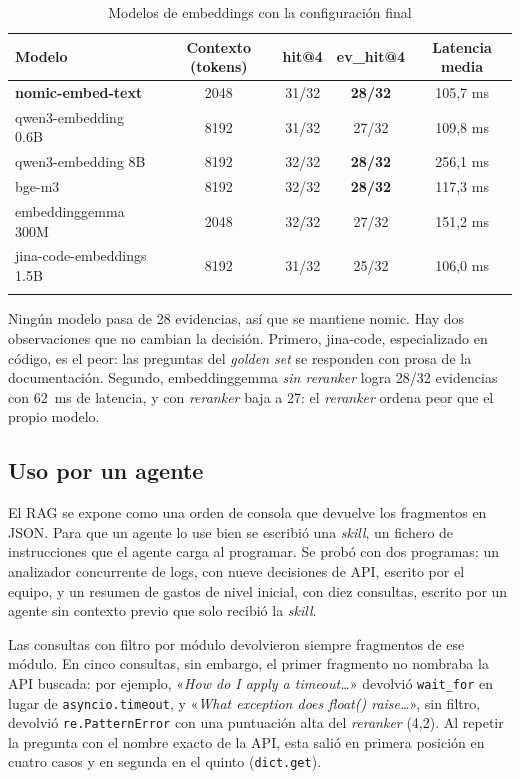 \documentclass[pdflatex,sn-mathphys-num]{sn-jnl}
\begin{document}
\begin{table}[h]
\caption{Modelos de embeddings con la configuración final}\label{tab:modelos}
\begin{tabular}{@{}lcccc@{}}
\toprule
Modelo & Contexto (tokens) & hit@4 & ev\_hit@4 & Latencia media \\
\midrule
\textbf{nomic-embed-text} & 2048 & 31/32 & \textbf{28/32} & 105,7 ms \\
qwen3-embedding 0.6B & 8192 & 31/32 & 27/32 & 109,8 ms \\
qwen3-embedding 8B\footnotemark[1] & 8192 & 32/32 & \textbf{28/32} & 256,1 ms \\
bge-m3 & 8192 & 32/32 & \textbf{28/32} & 117,3 ms \\
embeddinggemma 300M & 2048 & 32/32 & 27/32 & 151,2 ms \\
jina-code-embeddings 1.5B & 8192 & 31/32 & 25/32 & 106,0 ms \\
\botrule
\end{tabular}
\end{table}

Ningún modelo pasa de 28 evidencias, así que se mantiene nomic. Hay dos observaciones que no cambian la decisión. Primero, jina-code, especializado en código, es el peor: las preguntas del \emph{golden set} se responden con prosa de la documentación. Segundo, embeddinggemma \emph{sin reranker} logra 28/32 evidencias con 62~ms de latencia, y con \emph{reranker} baja a 27: el \emph{reranker} ordena peor que el propio modelo.

\subsection{Uso por un agente}\label{sec:res-agente}

El RAG se expone como una orden de consola que devuelve los fragmentos en JSON. Para que un agente lo use bien se escribió una \emph{skill}, un fichero de instrucciones que el agente carga al programar. Se probó con dos programas: un analizador concurrente de logs, con nueve decisiones de API, escrito por el equipo, y un resumen de gastos de nivel inicial, con diez consultas, escrito por un agente sin contexto previo que solo recibió la \emph{skill}.

Las consultas con filtro por módulo devolvieron siempre fragmentos de ese módulo. En cinco consultas, sin embargo, el primer fragmento no nombraba la API buscada: por ejemplo, «\emph{How do I apply a timeout\ldots}» devolvió \texttt{wait\_for} en lugar de \texttt{asyncio.timeout}, y «\emph{What exception does float() raise\ldots}», sin filtro, devolvió \texttt{re.PatternError} con una puntuación alta del \emph{reranker} (4,2). Al repetir la pregunta con el nombre exacto de la API, esta salió en primera posición en cuatro casos y en segunda en el quinto (\texttt{dict.get}).
\end{document}
